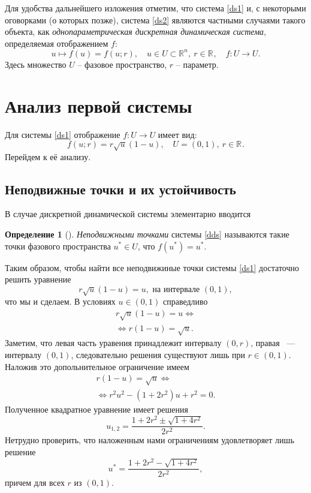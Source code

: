 \documentclass[oneside,final,12pt]{article}
\newcommand*\Rn  [1]{\mathbb{R}^{#1}}
\renewcommand*\equiv{\Leftrightarrow}
\newcommand*\inter[2]{(#1,#2)}
\theoremstyle{plain}
\theoremstyle{remark}
\theoremstyle{definition}
\newtheorem{definition}{Определение}
\theoremstyle{plain}
\begin{document}
	\bigskip
		Для удобства дальнейшего изложения отметим, что система \eqref{ds1} и, с некоторыми оговорками (о которых позже), система \eqref{ds2} являются частными случаями такого объекта, как \emph{однопараметрическая дискретная динамическая система}, определяемая отображением \(f\):
		\begin{equation}	\label{dds}
			u \mapsto f(u) = f(u;r), \quad u \in U \subset \Rn{n}, \: r \in \Rn{}, \quad f : U \rightarrow U.
		\end{equation}
		Здесь множество \(U\) -- фазовое пространство, \(r\) -- параметр.

	\section{Анализ первой системы}
		
		Для системы \eqref{ds1} отображение \(f : U \rightarrow U\)  имеет вид:
		\begin{equation}\label{ds1func}
			 f(u;r) = r \sqrt{u} (1-u), \quad U = \inter{0}{1}, \: r \in \Rn{}.
		\end{equation}
		Перейдем к её анализу.

	\subsection{Неподвижные точки и их устойчивость}
		В случае дискретной динамической системы элементарно вводится
		\begin{definition}[\cite{DSMB}]\label{stp_def}
			\emph{Неподвижными точками} системы \eqref{dds} называются такие точки фазового пространства \(u^* \in U\), что \( f(u^*) = u^* \). 
		\end{definition}
		Таким образом, чтобы найти все неподвижиные точки системы \eqref{ds1} достаточно решить уравнение
		\[ r \sqrt{u} (1-u) = u, \text{ на интервале } \inter{0}{1},\]
		что мы и сделаем. В условиях \( u \in \inter{0}{1} \) справедливо
		\begin{gather*}
			r \sqrt{u} (1-u) = u \equiv \\
			\equiv r (1-u) = \sqrt{u}.
		\end{gather*}
		Заметим, что левая часть уравения принадлежит интервалу \(\inter{0}{r}\), правая ~--- интервалу \(\inter{0}{1}\), следовательно решения существуют лишь при \( r \in \inter{0}{1} \). Наложив это допольнительное ограничение имеем
		\begin{gather*}
			r (1-u) = \sqrt{u} \equiv  \\
			\equiv r^2 u^2 - (1+2r^2) u + r^2 = 0.
		\end{gather*}
		Полученное квадратное уравнение имеет решения
		\[ u_{1,2} = \frac{1+2r^2 \pm \sqrt{1+4r^2}}{2r^2}.\]
		Нетрудно проверить, что наложенным нами ограничениям удовлетворяет лишь решение
\newcommand*{\ep}{\frac{1+2r^2 - \sqrt{1+4r^2}}{2r^2}}
		\begin{equation} \label{equ_pnt}
			 u^* = \ep, 
		\end{equation}
		причем для всех \(r\) из \(\inter{0}{1}\).
		
\end{document}
